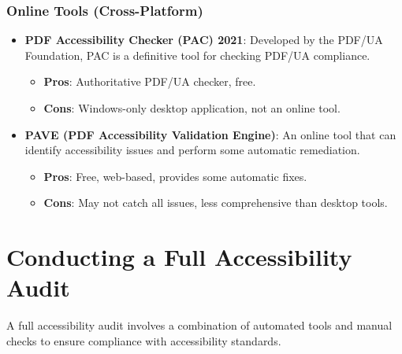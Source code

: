 \subsubsection{Online Tools (Cross-Platform)}
\label{ssubsec:online-tools-pdf}
\begin{itemize}
	\item \textbf{PDF Accessibility Checker (PAC) 2021}: Developed by the PDF/UA Foundation, PAC is a definitive tool for checking PDF/UA compliance.
	      \begin{itemize}
		      \item \textbf{Pros}: Authoritative PDF/UA checker, free.
		      \item \textbf{Cons}: Windows-only desktop application, not an online tool.
	      \end{itemize}
	\item \textbf{PAVE (PDF Accessibility Validation Engine)}: An online tool that can identify accessibility issues and perform some automatic remediation.
	      \begin{itemize}
		      \item \textbf{Pros}: Free, web-based, provides some automatic fixes.
		      \item \textbf{Cons}: May not catch all issues, less comprehensive than desktop tools.
	      \end{itemize}
\end{itemize}

\section{Conducting a Full Accessibility Audit}
\label{sec:full-accessibility-audit}
A full accessibility audit involves a combination of automated tools and manual checks to ensure compliance with accessibility standards.

